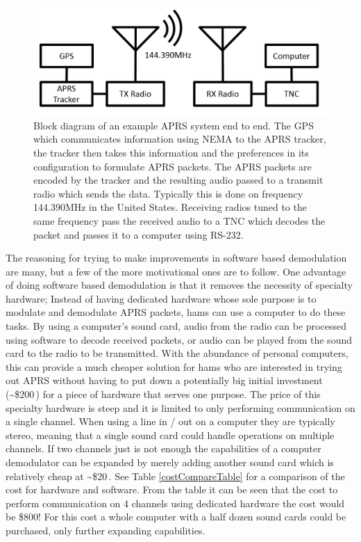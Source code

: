 \begin{figure}
  \centering
	\includegraphics[width=0.75\linewidth]{images/APRSEndToEnd.PNG} 
	\caption[Block diagram of an example APRS system end to end.]{Block diagram of an example APRS system end to end. The GPS which communicates information using NEMA to the APRS tracker, the tracker then takes this information and the preferences in its configuration to formulate APRS packets. The APRS packets are encoded by the tracker and the resulting audio passed to a transmit radio which sends the data. Typically this is done on frequency 144.390MHz in the United States. Receiving radios tuned to the same frequency pass the received audio to a TNC which decodes the packet and passes it to a computer using RS-232.}
   \label{APRSEndToEnd.PNG}
\end{figure}

The reasoning for trying to make improvements in software based demodulation are many, but a few of the more motivational ones are to follow. One advantage of doing software based demodulation is that it removes the necessity of specialty hardware; Instead of having dedicated hardware whose sole purpose is to modulate and demodulate APRS packets, hams can use a computer to do these tasks. By using a computer's sound card, audio from the radio can be processed using software to decode received packets, or audio can be played from the sound card to the radio to be transmitted. With the abundance of personal computers, this can provide a much cheaper solution for hams who are interested in trying out APRS without having to put down a potentially big initial investment (\textasciitilde\$200\,\cite{Kantronics2014,Outlet2014}) for a piece of hardware that serves one purpose. The price of this specialty hardware is steep and it is limited to only performing communication on a single channel. When using a line in / out on a computer they are typically stereo, meaning that a single sound card could handle operations on multiple channels. If two channels just is not enough the capabilities of a computer demodulator can be expanded by merely adding another sound card which is relatively cheap at \textasciitilde\$20\,\cite{Newegg}. See Table \ref{costCompareTable} for a comparison of the cost for hardware and software. From the table it can be seen that the cost to perform communication on 4 channels using dedicated hardware the cost would be \$800! For this cost a whole computer with a half dozen sound cards could be purchased, only further expanding capabilities.

